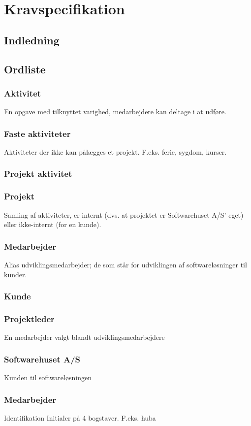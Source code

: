 \section{Kravspecifikation}
\subsection{Indledning}
\subsection{Ordliste}
\subsubsection{Aktivitet} En opgave med tilknyttet varighed, medarbejdere kan deltage i at udføre.
\subsubsection{Faste aktiviteter} Aktiviteter der ikke kan pålægges et projekt. F.eks. ferie, sygdom, kurser.
\subsubsection{Projekt aktivitet}
\subsubsection{Projekt} Samling af aktiviteter, er internt (dvs. at projektet er Softwarehuset A/S' eget) eller ikke-internt (for en kunde).
\subsubsection{Medarbejder} Alias udviklingsmedarbejder; de som står for udviklingen af softwareløsninger til kunder.
\subsubsection{Kunde}
\subsubsection{Projektleder} En medarbejder valgt blandt udviklingsmedarbejdere
\subsubsection{Softwarehuset A/S} Kunden til softwareløsningen
\subsubsection{Medarbejder} Identifikation	Initialer på 4 bogstaver. F.eks. huba
